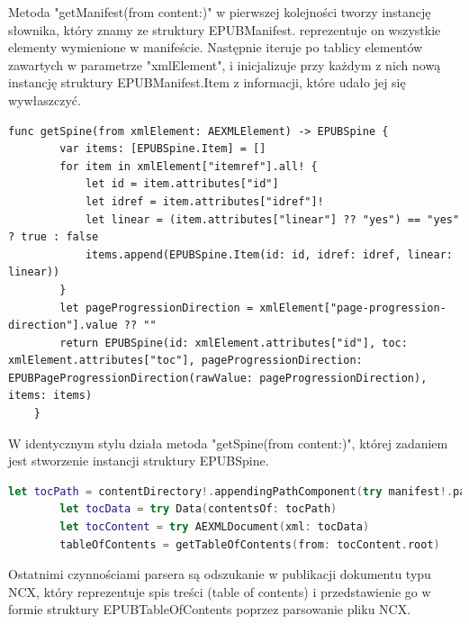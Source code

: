 Metoda "getManifest(from content:)" w pierwszej kolejności tworzy instancję słownika, który znamy ze struktury EPUBManifest. reprezentuje on wszystkie elementy wymienione w manifeście. Następnie iteruje po tablicy elementów zawartych w parametrze "xmlElement", i inicjalizuje przy każdym z nich nową instancję struktury EPUBManifest.Item z informacji, które udało jej się wywłaszczyć.

\begin{lstlisting}[caption={Implementacja metody getSpine(from xmlElement:).},language=swift-reference]
    func getSpine(from xmlElement: AEXMLElement) -> EPUBSpine {
        var items: [EPUBSpine.Item] = []
        for item in xmlElement["itemref"].all! {
            let id = item.attributes["id"]
            let idref = item.attributes["idref"]!
            let linear = (item.attributes["linear"] ?? "yes") == "yes" ? true : false
            items.append(EPUBSpine.Item(id: id, idref: idref, linear: linear))
        }
        let pageProgressionDirection = xmlElement["page-progression-direction"].value ?? ""
        return EPUBSpine(id: xmlElement.attributes["id"], toc: xmlElement.attributes["toc"], pageProgressionDirection: EPUBPageProgressionDirection(rawValue: pageProgressionDirection), items: items)
    }
\end{lstlisting}

W identycznym stylu działa metoda "getSpine(from content:)", której zadaniem jest stworzenie instancji struktury EPUBSpine.

\begin{lstlisting}[firstnumber=19, language=swift]
        let tocPath = contentDirectory!.appendingPathComponent(try manifest!.path(forItemWithId: spine?.toc ?? ""))
        let tocData = try Data(contentsOf: tocPath)
        let tocContent = try AEXMLDocument(xml: tocData)
        tableOfContents = getTableOfContents(from: tocContent.root)
\end{lstlisting}

Ostatnimi czynnościami parsera są odszukanie w publikacji dokumentu typu NCX, który reprezentuje spis treści (table of contents) i przedstawienie go w formie struktury EPUBTableOfContents poprzez parsowanie pliku NCX.

